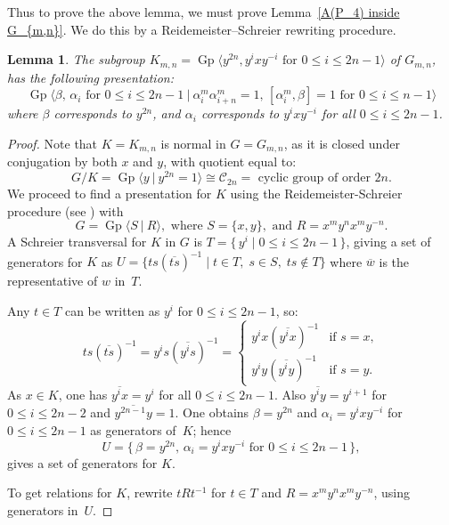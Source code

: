 \documentclass{amsart}
\newcommand{\Ggen}[1]{\operatorname{Gp}\bigl\langle #1 \bigr\rangle}
\newcommand{\Gpres}[2]{\operatorname{Gp}\bigl\langle #1\:|\:#2 \bigr\rangle}
\theoremstyle{plain}
\newtheorem{lemma}[theorem]{Lemma}
\theoremstyle{definition}
\begin{document}
Thus to prove the above lemma, we must prove Lemma~\ref{A(P_4) inside G_{m,n}}. We do this by a Reidemeister--Schreier rewriting procedure.

\begin{lemma}\label{2n index subgroup presentation}
The subgroup $K_{m,n} = \Ggen{y^{2n}, y^i x y^{-i} \text{ for $0 \leq i \leq 2n - 1$}}$ of $G_{m,n}$, has the following presentation:
\[
\Gpres{\beta,\, \alpha_i \text{ for $0 \leq i \leq 2n - 1$}}{\alpha_i^m \alpha_{i+n}^m=1,\, [\alpha_i^m, \beta]=1 \text{ for $0 \leq i \leq n - 1$}}
\]
where $\beta$ corresponds to $y^{2n}$, and $\alpha_i$ corresponds to $y^i x y^{-i}$ for all $0 \leq i \leq 2n - 1$.    
\end{lemma}
\begin{proof}
Note that $K = K_{m,n}$ is normal in $G = G_{m,n}$, as it is closed under conjugation by both $x$ and $y$, with quotient equal to:
\[
G/K = \Gpres{y}{y^{2n}=1} \cong \mathcal{C}_{2n} = \text{ cyclic group of order $2n$}.
\]
We proceed to find a presentation for $K$ using the Reidemeister-Schreier procedure (see \cite{lyndon1977combinatorial}) with 
\[
G = \Gpres{S}{R}, \text{ where } S = \{x,y\}, \text{ and } R = x^m y^n x^m y^{-n}.
\]
A Schreier transversal for $K$ in $G$ is
$T = \{\, y^i \mid 0 \leq i \leq 2n - 1 \,\}$, giving a set of generators for $K$ as $U = \{ts(\overline{ts})^{-1}\mid t\in T,\; s \in S,\; ts \not\in T \}$ where $\overline{w}$ is the representative of $w$ in~$T$. 

Any $t\in T$ can be written as $y^i$ for $0 \leq i \leq 2n-1$, so:
\[
ts(\overline{ts})^{-1} = y^{i}s(\overline{y^{i}s})^{-1} = 
\begin{cases}
    y^{i}x(\overline{y^{i}x})^{-1} & \text{if } s = x,\\
    y^{i}y(\overline{y^{i}y})^{-1} & \text{if } s = y.
\end{cases}
\]
As $x\in K$, one has $\overline{y^{i}x} = y^i$ for all $0 \leq i \leq 2n-1$. Also $\overline{y^{i}y} = y^{i+1}$ for $0 \leq i \leq 2n-2$ and $\overline{y^{2n-1}y} = 1$. One obtains $\beta = y^{2n}$ and $\alpha_i = y^ixy^{-i}$ for $0 \leq i \leq 2n-1$ as generators of~$K$; hence
\[
U = \{\, \beta = y^{2n},\, \alpha_i = y^ixy^{-i} \text{ for $0 \leq i \leq 2n-1$}\,\},
\]
gives a set of generators for $K$.
     
To get relations for $K$, rewrite $tRt^{-1}$ for $t\in T$ and $R = x^m y^n x^m y^{-n}$, using generators in~$U$.


\end{proof}
\end{document}
